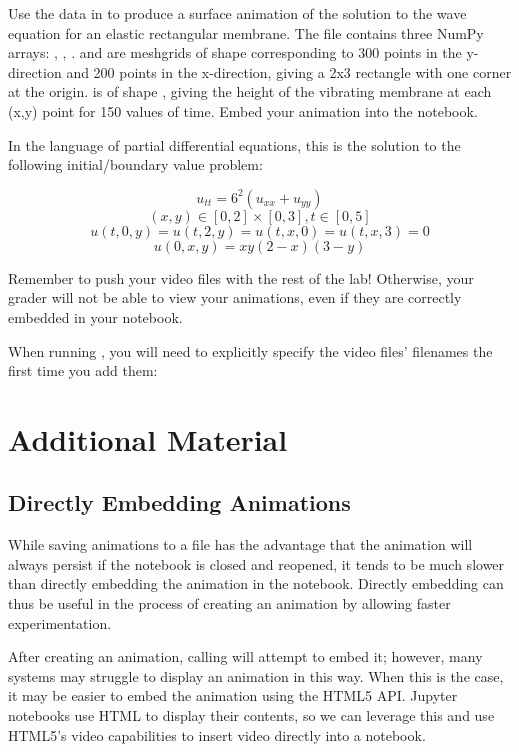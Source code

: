 \begin{problem}
Use the data in  to produce a surface animation of the solution to the wave equation for an elastic rectangular membrane.
The file contains three NumPy arrays: , , .
 and  are meshgrids of shape  corresponding to 300 points in the y-direction and 200 points in the x-direction, giving a 2x3 rectangle with one corner at the origin.
 is of shape , giving the height of the vibrating membrane at each (x,y) point for 150 values of time.
Embed your animation into the notebook.

In the language of partial differential equations, this is the solution to the following initial/boundary value problem:

$$u_{tt} = 6^2(u_{xx}+u_{yy})$$
$$(x,y) \in [0,2]\times[0,3], t \in [0,5]$$
$$u(t,0,y)=u(t,2,y)=u(t,x,0)=u(t,x,3) = 0$$
$$u(0,x,y) = xy(2-x)(3-y)$$
\end{problem}
\begin{warn}
Remember to push your video files with the rest of the lab!
Otherwise, your grader will not be able to view your animations, even if they are correctly embedded in your notebook.

When running , you will need to explicitly specify the video files' filenames the first time you add them: 
\end{warn}

\newpage
\section*{Additional Material}
\subsection*{Directly Embedding Animations}
While saving animations to a file has the advantage that the animation will always persist if the notebook is closed and reopened, it tends to be much slower than directly embedding the animation in the notebook.
Directly embedding can thus be useful in the process of creating an animation by allowing faster experimentation.

After creating an animation, calling  will attempt to embed it; however, many systems may struggle to display an animation in this way.
When this is the case, it may be easier to embed the animation using the HTML5 API.
Jupyter notebooks use HTML to display their contents, so we can leverage this and use HTML5's video capabilities to insert video directly into a notebook.

